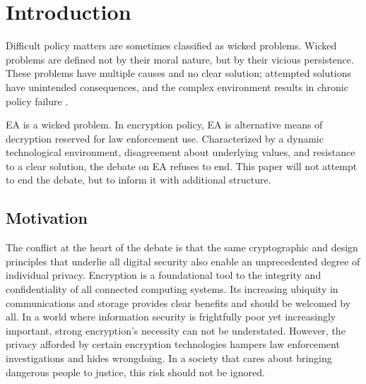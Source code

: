 \chapter{Introduction}
\label{chap-introduction}

Difficult policy matters are sometimes classified as wicked problems. Wicked problems are defined not by their moral
nature, but by their vicious persistence. These problems have multiple causes and no clear solution; attempted solutions
have unintended consequences, and the complex environment results in chronic policy failure
\cite{commission_tackling_2018}.

\Acl{EA} is a wicked problem. In encryption policy, \ac{EA} is alternative means of decryption reserved for law
enforcement use. Characterized by a dynamic technological environment, disagreement about underlying values, and
resistance to a clear solution, the debate on \acl{EA} refuses to end. This paper will not attempt to end the debate,
but to inform it with additional structure.

\section{Motivation}
\label{sec-motivation}



The conflict at the heart of the debate is that the same cryptographic and design principles that underlie all digital
security also enable an unprecedented degree of individual privacy. Encryption is a foundational tool to the integrity
and confidentiality of all connected computing systems. Its increasing ubiquity in communications and storage provides
clear benefits and should be welcomed by all. In a world where information security is frightfully poor yet increasingly
important, strong encryption's necessity can not be understated. However, the privacy afforded by certain encryption
technologies hampers law enforcement investigations and hides wrongdoing. In a society that cares about bringing
dangerous people to justice, this risk should not be ignored.

